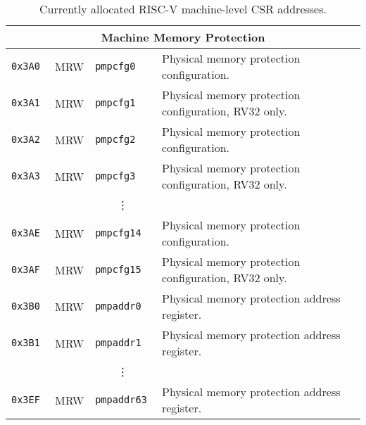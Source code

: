 \begin{table}[htb!]
\begin{center}
\begin{tabular}{|l|l|l|l|}
\hline
\multicolumn{4}{|c|}{Machine Memory Protection} \\
\hline
\tt 0x3A0 & MRW  &\tt pmpcfg0    & Physical memory protection configuration. \\
\tt 0x3A1 & MRW  &\tt pmpcfg1    & Physical memory protection configuration, RV32 only. \\
\tt 0x3A2 & MRW  &\tt pmpcfg2    & Physical memory protection configuration. \\
\tt 0x3A3 & MRW  &\tt pmpcfg3    & Physical memory protection configuration, RV32 only. \\
& & \multicolumn{1}{c|}{\vdots} & \ \\
\tt 0x3AE & MRW  &\tt pmpcfg14   & Physical memory protection configuration. \\
\tt 0x3AF & MRW  &\tt pmpcfg15   & Physical memory protection configuration, RV32 only. \\
\tt 0x3B0 & MRW  &\tt pmpaddr0   & Physical memory protection address register. \\
\tt 0x3B1 & MRW  &\tt pmpaddr1   & Physical memory protection address register. \\
& & \multicolumn{1}{c|}{\vdots} & \ \\
\tt 0x3EF & MRW  &\tt pmpaddr63  & Physical memory protection address register. \\
\hline
\end{tabular}
\end{center}
\caption{Currently allocated RISC-V machine-level CSR addresses.}
\label{mcsrnames0}
\end{table}

